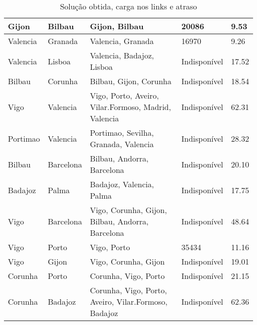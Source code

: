 \begin{table}[!htb]
{\begin{tabular}{|l|l|l|l|l|}
Gijon & Bilbau & Gijon, Bilbau & 20086 & 9.53 \\ \hline
Valencia & Granada & Valencia, Granada & 16970 & 9.26 \\ \hline
Valencia & Lisboa & Valencia, Badajoz, Lisboa & Indisponível & 17.52 \\ \hline
Bilbau & Corunha & Bilbau, Gijon, Corunha & Indisponível & 18.54 \\ \hline
Vigo & Valencia & Vigo, Porto, Aveiro, Vilar.Formoso, Madrid, Valencia & Indisponível & 62.31 \\ \hline
Portimao & Valencia & Portimao, Sevilha, Granada, Valencia & Indisponível & 28.32 \\ \hline
Bilbau & Barcelona & Bilbau, Andorra, Barcelona & Indisponível & 20.10 \\ \hline
Badajoz & Palma & Badajoz, Valencia, Palma & Indisponível & 17.75 \\ \hline
Vigo & Barcelona & Vigo, Corunha, Gijon, Bilbau, Andorra, Barcelona & Indisponível & 48.64 \\ \hline
Vigo & Porto & Vigo, Porto & 35434 & 11.16 \\ \hline
Vigo & Gijon & Vigo, Corunha, Gijon & Indisponível & 19.01 \\ \hline
Corunha & Porto & Corunha, Vigo, Porto & Indisponível & 21.15 \\ \hline
Corunha & Badajoz & Corunha, Vigo, Porto, Aveiro, Vilar.Formoso, Badajoz & Indisponível & 62.36 \\ \hline
\end{tabular}}
\caption[]{Solução obtida, carga nos links e atraso}
\end{table}

